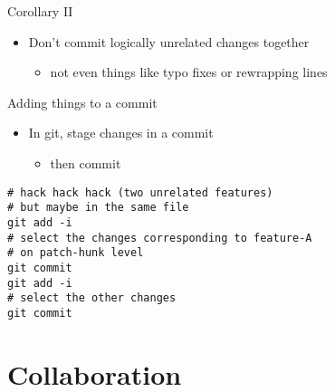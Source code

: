 \documentclass[presentation]{beamer}
\begin{document}
\begin{frame}[label=sec-1-15]{Corollary II}
\begin{itemize}
\item Don't commit logically unrelated changes together
\begin{itemize}
\item not even things like typo fixes or rewrapping lines
\end{itemize}
\end{itemize}
\end{frame}
\begin{frame}[fragile,label=sec-1-16]{Adding things to a commit}
 \begin{itemize}
\item In git, stage changes in a commit
\begin{itemize}
\item then commit
\end{itemize}
\end{itemize}

\begin{verbatim}
# hack hack hack (two unrelated features)
# but maybe in the same file
git add -i
# select the changes corresponding to feature-A
# on patch-hunk level
git commit
git add -i
# select the other changes
git commit
\end{verbatim}
\end{frame}
\section{Collaboration}
\label{sec-2}
\end{document}
